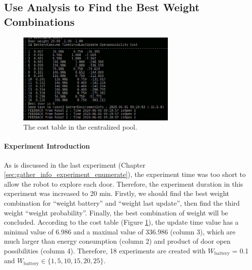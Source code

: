 \subsection{Use Analysis to Find the Best Weight Combinations}

\begin{figure}
 \centering
 \includegraphics[width = 0.7\textwidth]{content/images/ch5/weight_analyze.png}
 \caption{The cost table in the centralized pool.}
 \label{fig:cost_table}
\end{figure}

\paragraph{Experiment Introduction} 
As is discussed in the last experiment (Chapter \ref{sec:gather_info_experiment_enumerate}), the experiment time was too short to allow the robot to explore each door. Therefore, the experiment duration in this experiment was increased to 20 min.
Firstly, we should find the best weight combination for ``weight battery'' and ``weight last update'', then find the third weight ``weight probability''. Finally, the best combination of weight will be concluded.
 According to the cost table (Figure \ref{fig:cost_table}), the update time value has a minimal value of 6.986 and a maximal value of 336.986 (column 3), which are much larger than energy consumption (column 2) and product of door open possibilities (column 4).
 Therefore, 18 experiments are created with $W_{\mbox{battery}}$
 = 0.1 and $W_{\mbox{battery}} \in \{1,5,10,15,20,25 \}$.


